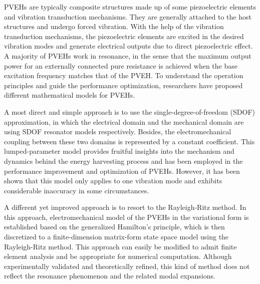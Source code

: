 \documentclass{article}
\begin{document}
PVEHs are typically composite structures made up of some piezoelectric elements and vibration transduction mechanisms. They are generally attached to the host structures and undergo forced vibration. With the help of the vibration transduction mechanisms, the piezoelectric elements are excited in the desired vibration modes and generate electrical outputs due to direct piezoelectric effect. A majority of PVEHs work in resonance, in the sense that the maximum output power for an externally connected pure resistance is achieved when the base excitation frequency matches that of the PVEH. \cite{roundy2003study} To understand the operation principles and guide the performance optimization, researchers have proposed different mathematical models for PVEHs. 

A most direct and simple approach is to use the single-degree-of-freedom (SDOF) approximation, in which the electrical domain and the mechanical domain are using SDOF resonator models respectively. Besides, the electromechanical coupling between these two domains is represented by a constant coefficient. \cite{roundy2003study,dutoit2005design} This lumped-parameter model provides fruitful insights into the mechanism and dynamics behind the energy harvesting process and has been employed in the performance improvement and optimization of PVEHs. \cite{stephen2006energy,cottone2009nonlinear} However, it has been shown that this model only applies to one vibration mode and exhibits considerable inaccuracy in some circumstances. \cite{erturk2008mechanical}

A different yet improved approach is to resort to the Rayleigh-Ritz method. In this approach, electromechanical model of the PVEHs in the variational form is established based on the generalized Hamilton's principle, \cite{crandall1968dynamics} which is then discretized to a finite-dimension matrix-form state space model using the Rayleigh-Ritz method. \cite{hagood1990modelling} This approach can easily be modified to admit finite element analysis and be appropriate for numerical computation. Although experimentally validated and theoretically refined, \cite{sodano2004estimation,lu2003modeling,chen2006analytical,ajitsaria2007modeling} this kind of method does not reflect the resonance phenomenon and the related modal expansions. 
\end{document}
